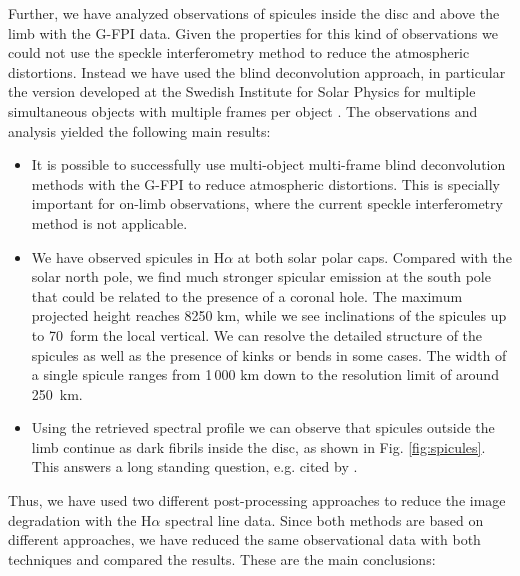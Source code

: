 Further, we have analyzed observations of spicules inside the disc and above the limb with the G-FPI data. Given the properties for this kind of observations we could not use the speckle interferometry method to reduce the atmospheric distortions. Instead we have used the blind deconvolution approach, in particular the version developed at the Swedish Institute for Solar Physics for multiple simultaneous objects with multiple frames per object \citep{2005SoPh..228..191V}. The observations and analysis yielded the following main results:
\begin{itemize}
\item It is possible to successfully use multi-object multi-frame blind deconvolution methods with the G-FPI to reduce atmospheric distortions. This is specially important for on-limb observations, where the current speckle interferometry method is not applicable.
 
\item We have observed spicules in H$\alpha$ at both solar polar caps. Compared with the solar north pole, we find much stronger spicular emission at the south pole that could be related to the presence of a coronal hole. The maximum projected height reaches 8250 km, while we see inclinations of the spicules up to 70\degr\, form the local vertical. We can resolve the detailed structure of the spicules as well as the presence of kinks or bends in some cases. The width of a single spicule ranges from 1\,000 km down to the resolution limit of around 250~km.
\item Using the retrieved spectral profile we can observe that spicules outside the limb continue as dark fibrils inside the disc, as shown in Fig.  \ref{fig:spicules}. This answers a long standing question, e.g. cited by \citet{1992A&A...264..236G}.

\end{itemize}
Thus, we have used two different post-processing approaches to reduce the image degradation with the H$\alpha$ spectral line data. Since both methods are based on different approaches, we have reduced the same observational data with both techniques and compared the results. These are the main conclusions:
